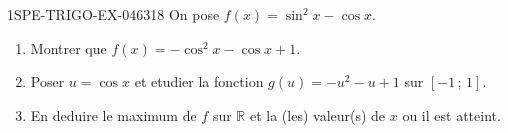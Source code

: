 \begin{exercice}{1SPE-TRIGO-EX-046}{3}{18}
On pose $f(x) = \sin^2 x - \cos x$.
\begin{enumerate}
  \item Montrer que $f(x) = -\cos^2 x - \cos x + 1$.
  \item Poser $u = \cos x$ et etudier la fonction $g(u) = -u^2 - u + 1$ sur $[-1\,;\,1]$.
  \item En deduire le maximum de $f$ sur $\mathbb{R}$ et la (les) valeur(s) de $x$ ou il est atteint.
\end{enumerate}
\end{exercice}
